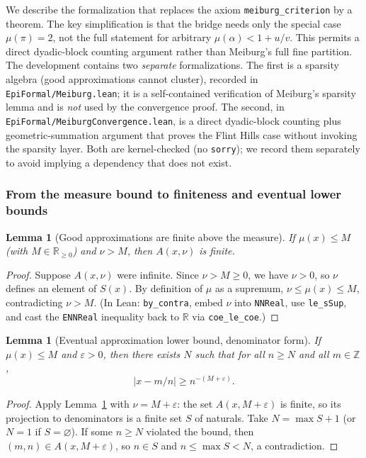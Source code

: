 \documentclass[11pt]{amsart}
\newtheorem{lemma}[theorem]{Lemma}
\theoremstyle{definition}
\theoremstyle{remark}
\numberwithin{equation}{section}
\newcommand{\R}{\mathbb{R}}
\newcommand{\Z}{\mathbb{Z}}
\newcommand{\irr}{\mu}
\begin{document}
We describe the formalization that replaces the axiom \texttt{meiburg\_criterion} by a theorem. The key simplification is that the bridge needs only the special case $\irr(\pi)=2$, not the full statement for arbitrary $\irr(\alpha)<1+u/v$. This permits a direct dyadic-block counting argument rather than Meiburg's full fine partition. The development contains two \emph{separate} formalizations. The first is a sparsity algebra (good approximations cannot cluster), recorded in \texttt{EpiFormal/\allowbreak{}Meiburg.lean}; it is a self-contained verification of Meiburg's sparsity lemma and is \emph{not} used by the convergence proof. The second, in \texttt{EpiFormal/\allowbreak{}MeiburgConvergence.lean}, is a direct dyadic-block counting plus geometric-summation argument that proves the Flint Hills case without invoking the sparsity layer. Both are kernel-checked (no \texttt{sorry}); we record them separately to avoid implying a dependency that does not exist.

\subsubsection{From the measure bound to finiteness and eventual lower bounds}

\begin{lemma}[Good approximations are finite above the measure]\label{lem:f2-finite}
If $\irr(x)\le M$ (with $M\in\R_{\ge0}$) and $\nu>M$, then $A(x,\nu)$ is finite.
\end{lemma}
\begin{proof}
Suppose $A(x,\nu)$ were infinite. Since $\nu>M\ge0$, we have $\nu>0$, so $\nu$ defines an element of $S(x)$. By definition of $\irr$ as a supremum, $\nu\le\irr(x)\le M$, contradicting $\nu>M$. (In Lean: \texttt{by\_contra}, embed $\nu$ into \texttt{NNReal}, use \texttt{le\_sSup}, and cast the \texttt{ENNReal} inequality back to $\R$ via \texttt{coe\_le\_coe}.)
\end{proof}

\begin{lemma}[Eventual approximation lower bound, denominator form]\label{lem:f2-eventual}
If $\irr(x)\le M$ and $\varepsilon>0$, then there exists $N$ such that for all $n\ge N$ and all $m\in\Z$,
\[
|x-m/n|\ge n^{-(M+\varepsilon)}.
\]
\end{lemma}
\begin{proof}
Apply Lemma~\ref{lem:f2-finite} with $\nu=M+\varepsilon$: the set $A(x,M+\varepsilon)$ is finite, so its projection to denominators is a finite set $S$ of naturals. Take $N=\max S+1$ (or $N=1$ if $S=\varnothing$). If some $n\ge N$ violated the bound, then $(m,n)\in A(x,M+\varepsilon)$, so $n\in S$ and $n\le\max S<N$, a contradiction.
\end{proof}
\end{document}
